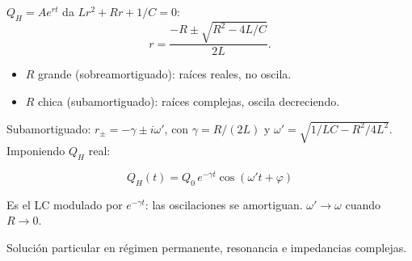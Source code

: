 \documentclass[12pt,a4paper]{article}
\begin{document}
$Q_H = A e^{rt}$ da $L r^2 + R r + 1/C = 0$:
\[
r = \frac{-R \pm \sqrt{R^2 - 4L/C}}{2L}.
\]

\begin{itemize}[nosep]
  \item $R$ grande (sobreamortiguado): raíces reales, no oscila.
  \item $R$ chica (subamortiguado): raíces complejas, oscila decreciendo.
\end{itemize}

Subamortiguado: $r_\pm = -\gamma \pm i\omega'$, con $\gamma = R/(2L)$ y
$\omega' = \sqrt{1/LC - R^2/4L^2}$. Imponiendo $Q_H$ real:

\begin{keybox}
  \[
  \boxed{Q_H(t) = Q_0\, e^{-\gamma t}\cos(\omega' t + \varphi)}
  \]
\end{keybox}

Es el LC modulado por $e^{-\gamma t}$: las oscilaciones se amortiguan.
$\omega' \to \omega$ cuando $R \to 0$.



\begin{notebox}
  Solución particular en régimen permanente, resonancia e impedancias complejas.
\end{notebox}
\end{document}
